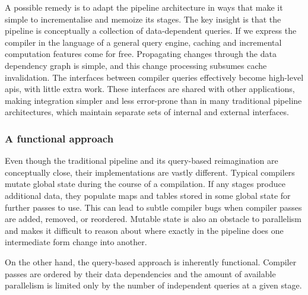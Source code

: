 A possible remedy is to adapt the pipeline architecture in ways that make it
simple to incrementalise and memoize its stages. The key insight is that the
pipeline is conceptually a collection of data-dependent queries. If we express
the compiler in the language of a general query engine, caching and incremental
computation features come for free. Propagating changes through the data
dependency graph is simple, and this change processing subsumes cache
invalidation. The interfaces between compiler queries effectively become
high-level \acrshort{api}s, with little extra work. These interfaces are shared
with other applications, making integration simpler and less error-prone than in
many traditional pipeline architectures, which maintain separate sets of
internal and external interfaces.

\subsubsection*{A functional approach}

Even though the traditional pipeline and its query-based reimagination are
conceptually close, their implementations are vastly different. Typical
compilers mutate global state during the course of a compilation. If any stages
produce additional data, they populate maps and tables stored in some global
state for further passes to use. This can lead to subtle compiler bugs when
compiler passes are added, removed, or reordered. Mutable state is also an
obstacle to parallelism and makes it difficult to reason about where exactly in
the pipeline does one intermediate form change into another.

On the other hand, the query-based approach is inherently functional. Compiler
passes are ordered by their data dependencies and the amount of available
parallelism is limited only by the number of independent queries at a given
stage.
